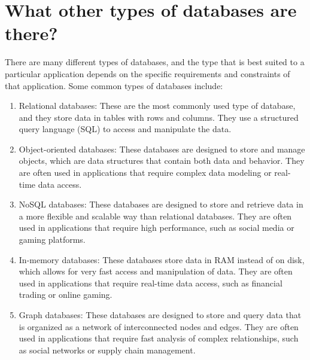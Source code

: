 \chapter{What other types of databases are there?}

There are many different types of databases, and the type that is best suited to a particular application depends on the specific requirements and constraints of that application. Some common types of databases include:


\begin{enumerate}
	\item Relational databases: These are the most commonly used type of database, and they store data in tables with rows and columns. They use a structured query language (SQL) to access and manipulate the data.
	
	\item Object-oriented databases: These databases are designed to store and manage objects, which are data structures that contain both data and behavior. They are often used in applications that require complex data modeling or real-time data access.
	
	\item NoSQL databases: These databases are designed to store and retrieve data in a more flexible and scalable way than relational databases. They are often used in applications that require high performance, such as social media or gaming platforms.
	
	\item In-memory databases: These databases store data in RAM instead of on disk, which allows for very fast access and manipulation of data. They are often used in applications that require real-time data access, such as financial trading or online gaming.
	
	\item Graph databases: These databases are designed to store and query data that is organized as a network of interconnected nodes and edges. They are often used in applications that require fast analysis of complex relationships, such as social networks or supply chain management.
	
	
	
	
\end{enumerate}